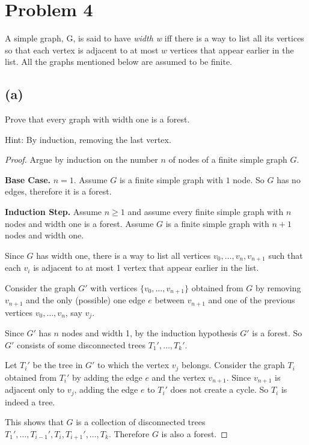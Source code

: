 \documentclass[14pt]{extarticle}
\begin{document}
\section{Problem 4}
A simple graph, G, is said to have {\it width w} iff there is a way to list all its vertices so that each vertex is adjacent to at most $w$ vertices that appear earlier in the list. All the graphs mentioned below are assumed to be finite.

\subsection{(a)}
Prove that every graph with width one is a forest.

Hint: By induction, removing the last vertex.

\begin{proof}
Argue by induction on the number $n$ of nodes of a finite simple graph $G$.

{\bf Base Case.} $n = 1$. Assume $G$ is a finite simple graph with $1$ node. So $G$ has no edges, therefore it is a forest.

{\bf Induction Step.} Assume $n \geq 1$ and assume every finite simple graph with $n$ nodes and width one is a forest. Assume $G$ is a finite simple graph with $n+1$ nodes and width one.

Since $G$ has width one, there is a way to list all vertices $v_0, \ldots, v_n, v_{n+1}$ such that each $v_i$ is adjacent to at most 1 vertex that appear earlier in the list.

Consider the graph $G'$ with vertices $\{v_0, \ldots, v_{n+1}\}$ obtained from $G$ by removing $v_{n+1}$ and the only (possible) one edge $e$ between $v_{n+1}$ and one of the previous vertices $v_0, \ldots, v_n$, say $v_j$.

Since $G'$ has $n$ nodes and width 1, by the induction hypothesis $G'$ is a forest. So $G'$ consists of some disconnected trees $T_1', \ldots, T_k'$.

Let $T_i'$ be the tree in $G'$ to which the vertex $v_j$ belongs. Consider the graph $T_i$ obtained from $T_i'$ by adding the edge $e$ and the vertex $v_{n+1}$. Since $v_{n+1}$ is adjacent only to $v_j$, adding the edge $e$ to $T_i'$ does not create a cycle. So $T_i$ is indeed a tree.

This shows that $G$ is a collection of disconnected trees $T_1', \ldots, T_{i-1}', T_i, T_{i+1}', \ldots, T_k$. Therefore $G$ is also a forest.

\end{proof}
\end{document}
